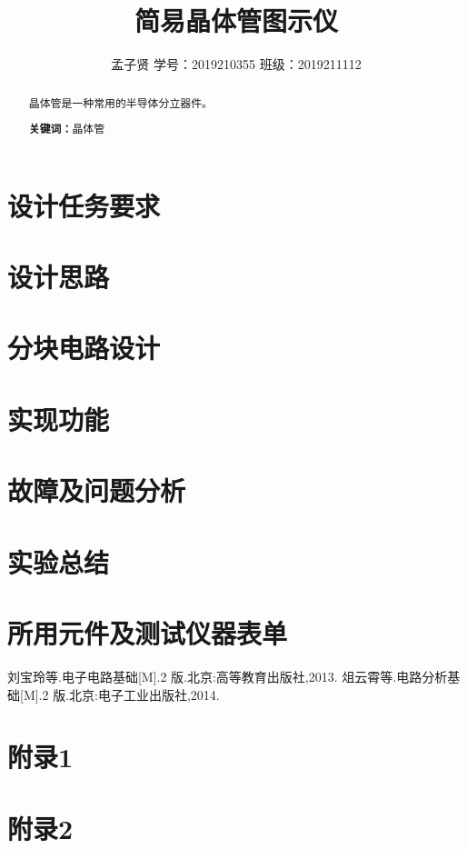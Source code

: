 \documentclass[]{article}
\title{简易晶体管图示仪}
\author{孟子贤  \quad 学号：2019210355 \quad 班级：2019211112}
\begin{document}
\maketitle
\begin{abstract}
  晶体管是一种常用的半导体分立器件。
  \centering
\par\textbf{关键词：}晶体管
\end{abstract}

\section{设计任务要求}
\section{设计思路}
\section{分块电路设计}
\section{实现功能}
\section{故障及问题分析}
\section{实验总结}
\section{所用元件及测试仪器表单}
\begin{thebibliography}{99}
 刘宝玲等.电子电路基础[M].2 版.北京:高等教育出版社,2013.
 俎云霄等.电路分析基础[M].2 版.北京:电子工业出版社,2014.
\end{thebibliography}

\begin{appendix}
\section{附录1}
\section{附录2}
\end{appendix}
\end{document}

